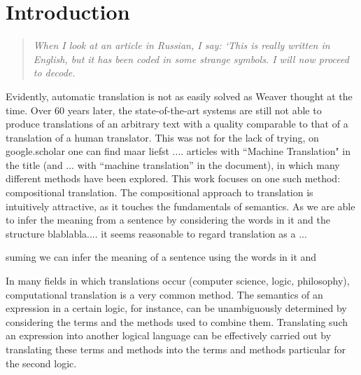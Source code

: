 \documentclass{report}
\author{}
\title{}
\theoremstyle{definition}
\theoremstyle{plain}
\begin{document}
\maketitle
\tableofcontents




\chapter{Introduction}



\begin{quote}
\textit{When I look at an article in Russian, I say: `This is really written in English, but it has been coded in some strange symbols. I will now proceed to decode.}
\end{quote}

Evidently, automatic translation is not as easily solved as Weaver thought at the time. Over 60 years later, the state-of-the-art systems are still not able to produce translations of an arbitrary text with a quality comparable to that of a translation of a human translator. This was not for the lack of trying, on google.scholar one can find maar liefst .... articles with ``Machine Translation" in the title (and ... with ``machine translation'' in the document), in which many different methods have been explored. This work focuses on one such method: compositional translation. The compositional approach to translation is intuitively attractive, as it touches the fundamentals of semantics. As we are able to infer the meaning from a sentence by considering the words in it and the structure blablabla.... it seems reasonable to regard translation as a ...

suming we can infer the meaning of a sentence using the words in it and 




In many fields in which translations occur (computer science, logic, philosophy), computational translation is a very common method. The semantics of an expression in a certain logic, for instance, can be unambiguously determined by considering the terms and the methods used to combine them. Translating such an expression into another logical language can be effectively carried out by translating these terms and methods into the terms and methods particular for the second logic.
\end{document}
